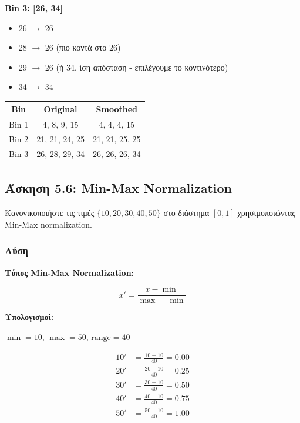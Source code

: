 \textbf{Bin 3: [26, 34]}
\begin{itemize}
    \item 26 $\to$ 26
    \item 28 $\to$ 26 (πιο κοντά στο 26)
    \item 29 $\to$ 26 (ή 34, ίση απόσταση - επιλέγουμε το κοντινότερο)
    \item 34 $\to$ 34
\end{itemize}

\begin{center}
\begin{tabular}{ccc}
\toprule
\textbf{Bin} & \textbf{Original} & \textbf{Smoothed} \\
\midrule
Bin 1 & 4, 8, 9, 15 & 4, 4, 4, 15 \\
Bin 2 & 21, 21, 24, 25 & 21, 21, 25, 25 \\
Bin 3 & 26, 28, 29, 34 & 26, 26, 26, 34 \\
\bottomrule
\end{tabular}
\end{center}

\subsection{Άσκηση 5.6: Min-Max Normalization}

\begin{formulabox}[Εκφώνηση]
Κανονικοποιήστε τις τιμές $\{10, 20, 30, 40, 50\}$ στο διάστημα $[0, 1]$
χρησιμοποιώντας Min-Max normalization.
\end{formulabox}

\subsubsection*{Λύση}

\textbf{Τύπος Min-Max Normalization:}

$$x' = \frac{x - \min}{\max - \min}$$

\textbf{Υπολογισμοί:}

$\min = 10$, $\max = 50$, $\text{range} = 40$

\begin{align*}
10' &= \frac{10 - 10}{40} = 0.00 \\
20' &= \frac{20 - 10}{40} = 0.25 \\
30' &= \frac{30 - 10}{40} = 0.50 \\
40' &= \frac{40 - 10}{40} = 0.75 \\
50' &= \frac{50 - 10}{40} = 1.00
\end{align*}

